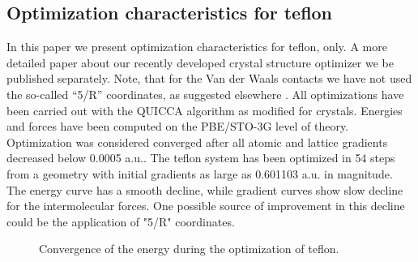 \documentclass[prl,aps,preprint,superbib,12pt]{revtex4}
\begin{document}
\subsection{Optimization characteristics for teflon}
In this paper we present optimization characteristics
for teflon, only. A more detailed paper about our recently 
developed crystal structure optimizer we be published separately.
Note, that for the Van der Waals contacts we have not used
the so-called ``5/R'' coordinates, as suggested elsewhere
\cite{JBaker00,TBucko05}. All optimizations have been carried out with
the QUICCA algorithm \cite{KNemeth04} as modified for crystals.
Energies and forces have been computed on the PBE/STO-3G level of
theory. Optimization was considered converged after all
atomic and lattice gradients decreased below 0.0005 a.u..
The teflon system has been optimized in 54 steps from a geometry
with initial gradients as large as 0.601103 a.u. in magnitude.
The energy curve has a smooth decline, while gradient curves 
show slow decline for the intermolecular forces. One possible 
source of improvement in this decline 
could be the application of "5/R" coordinates.
\begin{figure}[h]
\caption{
Convergence of the energy during the optimization of teflon.
\label{PETN}
}
\end{figure}
\end{document}
